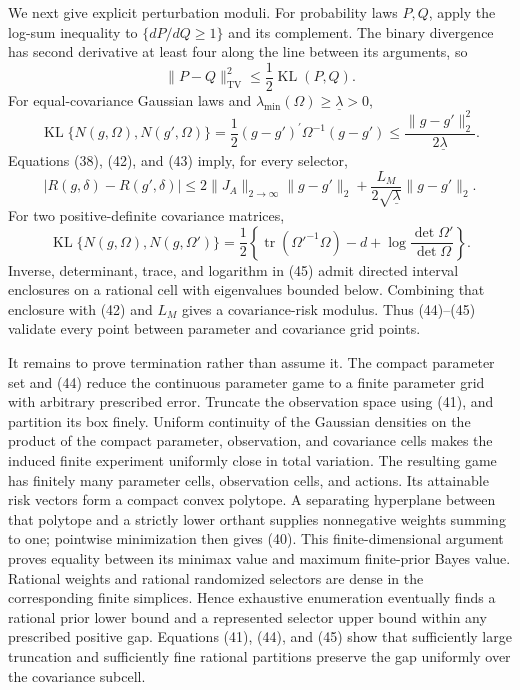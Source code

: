 We next give explicit perturbation moduli.  For probability laws \(P,Q\), apply the log-sum inequality to \(\{dP/dQ\geq1\}\) and its complement.  The binary divergence has second derivative at least four along the line between its arguments, so
\[
\lVert P-Q\rVert_{\mathrm{TV}}^2\leq\frac12\operatorname{KL}(P,Q). \tag{42}
\]
For equal-covariance Gaussian laws and \(\lambda_{\min}(\Omega)\geq\underline\lambda>0\),
\[
\operatorname{KL}\{N(g,\Omega),N(g',\Omega)\}
=\frac12(g-g')^{\prime}\Omega^{-1}(g-g')
\leq\frac{\lVert g-g'\rVert_2^2}{2\underline\lambda}. \tag{43}
\]
Equations (38), (42), and (43) imply, for every selector,
\[
|R(g,\delta)-R(g',\delta)|
\leq2\lVert J_A\rVert_{2\to\infty}\lVert g-g'\rVert_2
+\frac{L_M}{2\sqrt{\underline\lambda}}\lVert g-g'\rVert_2. \tag{44}
\]
For two positive-definite covariance matrices,
\[
\operatorname{KL}\{N(g,\Omega),N(g,\Omega')\}
=\frac12\left\{\operatorname{tr}(\Omega'^{-1}\Omega)-d
+\log\frac{\det\Omega'}{\det\Omega}\right\}. \tag{45}
\]
Inverse, determinant, trace, and logarithm in (45) admit directed interval enclosures on a rational cell with eigenvalues bounded below.  Combining that enclosure with (42) and \(L_M\) gives a covariance-risk modulus.  Thus (44)--(45) validate every point between parameter and covariance grid points.

It remains to prove termination rather than assume it.  The compact parameter set and (44) reduce the continuous parameter game to a finite parameter grid with arbitrary prescribed error.  Truncate the observation space using (41), and partition its box finely.  Uniform continuity of the Gaussian densities on the product of the compact parameter, observation, and covariance cells makes the induced finite experiment uniformly close in total variation.  The resulting game has finitely many parameter cells, observation cells, and actions.  Its attainable risk vectors form a compact convex polytope.  A separating hyperplane between that polytope and a strictly lower orthant supplies nonnegative weights summing to one; pointwise minimization then gives (40).  This finite-dimensional argument proves equality between its minimax value and maximum finite-prior Bayes value.  Rational weights and rational randomized selectors are dense in the corresponding finite simplices.  Hence exhaustive enumeration eventually finds a rational prior lower bound and a represented selector upper bound within any prescribed positive gap.  Equations (41), (44), and (45) show that sufficiently large truncation and sufficiently fine rational partitions preserve the gap uniformly over the covariance subcell.

